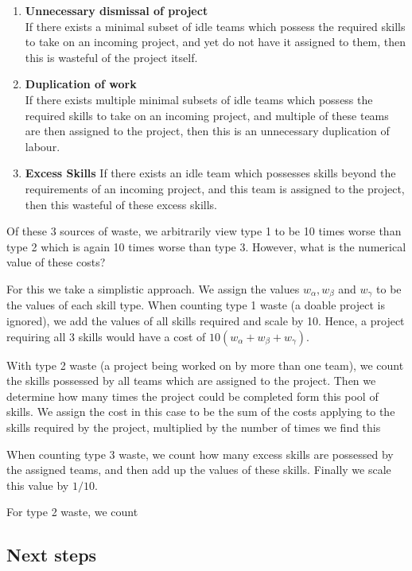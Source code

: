 \begin{enumerate}
	\item \textbf{Unnecessary dismissal of project}\\
	If there exists a minimal subset of idle teams which possess the required skills to take on an incoming project, and yet do not have it assigned to them, then this is wasteful of the project itself.
	
	\item \textbf{Duplication of work}\\
	If there exists multiple minimal subsets of idle teams which possess the required skills to take on an incoming project, and multiple of these teams are then assigned to the project, then this is an unnecessary duplication of labour.
	
	\item \textbf{Excess Skills}
	If there exists an idle team which possesses skills beyond the requirements of an incoming project, and this team is assigned to the project, then this wasteful of these excess skills.
\end{enumerate}

Of these 3 sources of waste, we arbitrarily view type 1 to be 10 times worse than type 2 which is again 10 times worse than type 3. However, what is the numerical value of these costs?

For this we take a simplistic approach. We assign the values $w_\alpha, w_\beta$ and $w_\gamma$ to be the values of each skill type. When counting type 1 waste (a doable project is ignored), we add the values of all skills required and scale by 10. Hence, a project requiring all 3 skills would have a cost of $10(w_\alpha+w_\beta+w_\gamma)$.

With type 2 waste (a project being worked on by more than one team), we count the skills possessed by all teams which are assigned to the project. Then we determine how many times the project could be completed form this pool of skills. We assign the cost in this case to be the sum of the costs applying to the skills required by the project, multiplied by the number of times we find this 

 When counting type 3 waste, we count how many excess skills are possessed by the assigned teams, and then add up the values of these skills. Finally we scale this value by $1/10$.

For type 2 waste, we count 




\subsection{Next steps}

